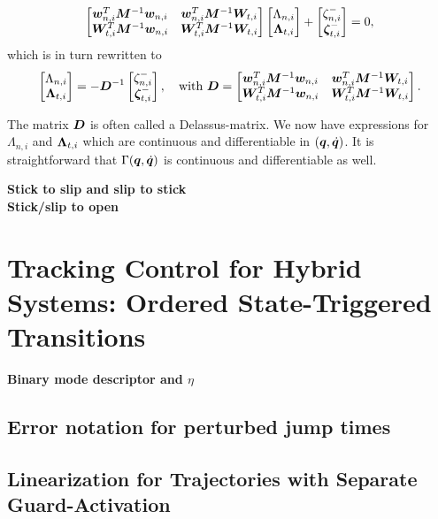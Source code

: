\documentclass[../DC2017114Bouma.tex]{subfiles}
\begin{document}
\begin{align}
\begin{bmatrix}
{\boldsymbol{w}}_{n,i}^T{\boldsymbol{M}}^{-1}{\boldsymbol{w}}_{n,i} & {\boldsymbol{w}}_{n,i}^T{\boldsymbol{M}}^{-1}{\boldsymbol{W}}_{t,i} \\
{\boldsymbol{W}}_{t,i}^T{\boldsymbol{M}}^{-1}{\boldsymbol{w}}_{n,i} & {\boldsymbol{W}}_{t,i}^T{\boldsymbol{M}}^{-1}{\boldsymbol{W}}_{t,i}
\end{bmatrix}
\begin{bmatrix}
\Lambda_{n,i}\\
\boldsymbol{\Lambda}_{t,i}
\end{bmatrix} + \begin{bmatrix}
\zeta_{n,i}^-\\
\boldsymbol{\zeta}_{t,i}^-
\end{bmatrix}
= 0,
\end{align}
which is in turn rewritten to
\begin{align}
\begin{bmatrix}
\Lambda_{n,i}\\
\boldsymbol{\Lambda}_{t,i}
\end{bmatrix} = - {\boldsymbol{D}}^{-1}\begin{bmatrix}
\zeta_{n,i}^-\\
\boldsymbol{\zeta}_{t,i}^-
\end{bmatrix},\quad \text{with } {\boldsymbol{D}} = \begin{bmatrix}
{\boldsymbol{w}}_{n,i}^T{\boldsymbol{M}}^{-1}{\boldsymbol{w}}_{n,i} & {\boldsymbol{w}}_{n,i}^T{\boldsymbol{M}}^{-1}{\boldsymbol{W}}_{t,i} \\
{\boldsymbol{W}}_{t,i}^T{\boldsymbol{M}}^{-1}{\boldsymbol{w}}_{n,i} & {\boldsymbol{W}}_{t,i}^T{\boldsymbol{M}}^{-1}{\boldsymbol{W}}_{t,i}
\end{bmatrix}.
\end{align}

The matrix ${\boldsymbol{D}}$ is often called a Delassus-matrix. We now have expressions for $\Lambda_{n,i}$ and $\boldsymbol{\Lambda}_{t,i}$ which are continuous and differentiable in $({\boldsymbol{q}},\dot{{\boldsymbol{q}}})$. It is straightforward that $\Gamma({\boldsymbol{q}},\dot{{\boldsymbol{q}}})$ is continuous and differentiable as well.

\textbf{Stick to slip and slip to stick}\\

\textbf{Stick/slip to open}\\

\cleartooddpage
\chapter{Tracking Control for Hybrid Systems: Ordered State-Triggered Transitions}
\cite{Rijnen2017}
\textbf{Binary mode descriptor and $\eta$}\\

\section{Error notation for perturbed jump times}
\section{Linearization for Trajectories with Separate Guard-Activation}
\end{document}
